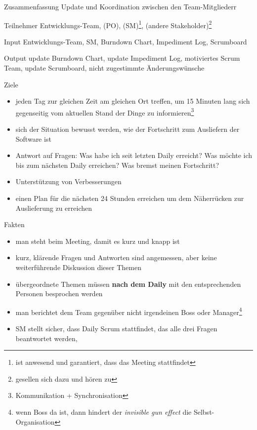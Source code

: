 \begin{Beschreibungfett}[Zusammenfassung]
  \item [Zusammenfassung] Update und Koordination zwischen den Team-Mitgliederr
  \item [Teilnehmer] Entwicklungs-Team, (PO), (SM)\footnote{ist anwesend und garantiert, dass das
      Meeting stattfindet}, (andere Stakeholder)\footnote{gesellen sich dazu und hören zu}
  \item [Input] Entwicklungs-Team, SM, Burndown Chart, Impediment Log, Scrumboard
  \item [Output] update Burndown Chart, update Impediment Log, motiviertes Scrum Team, update
    Scrumboard, nicht zugestimmte Änderungswünsche
  \item [Ziele]
    \begin{itemize}
      \item jeden Tag zur gleichen Zeit am gleichen Ort treffen, um 15 Minuten lang sich gegenseitig
        vom aktuellen Stand der Dinge zu informieren\footnote{Kommunikation + Synchronisation}
      \item sich der Situation bewusst werden, wie der Fortschritt zum Ausliefern der Software
        ist
      \item Antwort auf Fragen: Was habe ich seit letzten Daily erreicht? Was möchte ich bis zum
        nächsten Daily erreichen? Was bremst meinen Fortschritt?
      \item Unterstützung von Verbesserungen
      \item einen Plan für die nächsten 24 Stunden erreichen um dem Näherrücken zur
        Auslieferung zu erreichen
    \end{itemize}
  \item [Fakten]
  \begin{itemize}
    \item man steht beim Meeting, damit es kurz und knapp ist
    \item kurz, klärende Fragen und Antworten sind angemessen, aber keine weiterführende
      Diskussion dieser Themen
    \item übergeordnete Themen müssen \textbf{nach dem Daily} mit den entsprechenden Personen
      besprochen werden
    \item man berichtet dem Team gegenüber nicht irgendeinen Boss oder Manager\footnote{wenn Boss da ist, dann hindert der \textit{invisible gun effect} die Selbst-Organisation}
    \item SM stellt sicher, dass Daily Scrum stattfindet, das alle drei Fragen beantwortet werden,

\end{itemize}
\end{Beschreibungfett}
